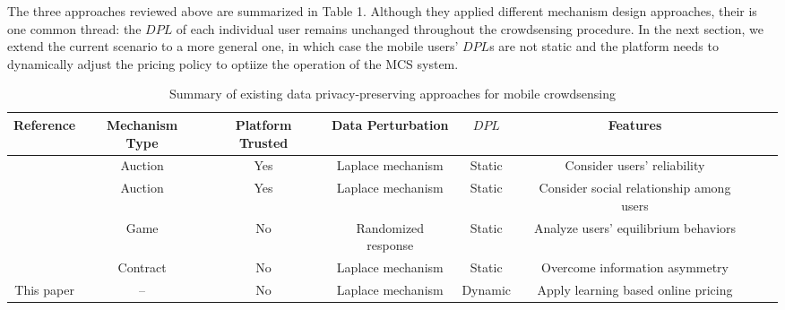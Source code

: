 The three approaches reviewed above are summarized in Table 1. Although they applied different mechanism design approaches, their is one common thread: the $DPL$ of each individual user remains unchanged throughout the crowdsensing procedure. In the next section, we extend the current scenario to a more general one, in which case the mobile users' $DPL$s are not static and the platform needs to dynamically adjust the pricing policy to optiize the operation of the MCS system.

\begin{table}[!htp]
	\caption{Summary of existing data privacy-preserving approaches for mobile crowdsensing}
	\centering
	\tabcolsep=10pt
	\begin{tabular}[c]{|c|c|c|c|c|c|c|c|}
		\hline \label{table:comparison}
		Reference & Mechanism Type & Platform Trusted &  Data Perturbation & $DPL$ & Features \\ \hline\hline
		
		\cite{jin2016}	  & Auction  	   &        Yes		  &	Laplace mechanism	&  Static & Consider users' reliability	\\ \hline

		
		\cite{zhang2016privacy}	  & Auction		   &        Yes 	      & Laplace mechanism  &  Static & Consider social relationship among users	\\ \hline

		\cite{wang2016value}	  & Game		   &        No 	      &   Randomized response	& Static & Analyze users' equilibrium behaviors	\\ \hline

		\cite{Kun1}	  & Contract	   &		No		  & Laplace mechanism & Static & Overcome information asymmetry \\ \hline

		This paper & -- &		No		  & Laplace mechanism  & Dynamic & Apply learning based online pricing	\\ \hline
	\end{tabular}
\end{table}

